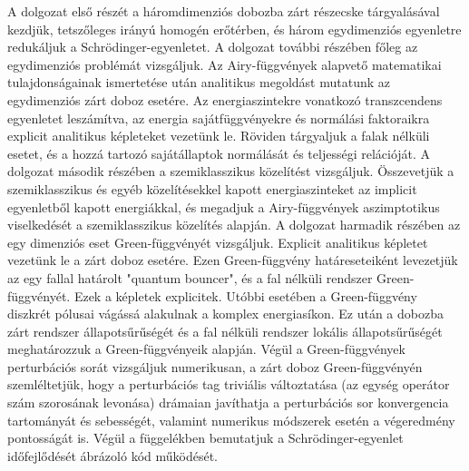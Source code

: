 A dolgozat első részét a háromdimenziós dobozba zárt részecske tárgyalásával kezdjük, tetszőleges irányú homogén erőtérben, és három egydimenziós egyenletre redukáljuk a Schrödinger-egyenletet. A dolgozat további részében főleg az egydimenziós problémát vizsgáljuk. Az Airy-függvények alapvető matematikai tulajdonságainak ismertetése után analitikus megoldást mutatunk az egydimenziós zárt doboz esetére. Az energiaszintekre vonatkozó transzcendens egyenletet leszámítva, az energia sajátfüggvényekre és normálási faktoraikra explicit analitikus képleteket vezetünk le. Röviden tárgyaljuk a falak nélküli esetet, és a hozzá tartozó sajátállaptok normálását és teljességi relációját.
A dolgozat második részében a szemiklasszikus közelítést vizsgáljuk. Összevetjük a szemiklasszikus és egyéb közelítésekkel kapott energiaszinteket az implicit egyenletből kapott energiákkal, és megadjuk a Airy-függvények aszimptotikus viselkedését a szemiklasszikus közelítés alapján.
A dolgozat harmadik részében az egy dimenziós eset Green-függvényét vizsgáljuk. Explicit analitikus képletet vezetünk le a zárt doboz esetére. Ezen Green-függvény határeseteiként levezetjük az egy fallal határolt "quantum bouncer", és a fal nélküli rendszer Green-függvényét. Ezek a képletek explicitek. Utóbbi esetében a Green-függvény diszkrét pólusai vágássá alakulnak a komplex energiasíkon. Ez után a dobozba zárt rendszer állapotsűrűségét és a fal nélküli rendszer lokális állapotsűrűségét meghatározzuk a Green-függvényeik alapján. Végül a Green-függvények perturbációs sorát vizsgáljuk numerikusan, a zárt doboz Green-függvényén szemléltetjük, hogy a perturbációs tag triviális változtatása (az egység operátor szám szorosának levonása) drámaian javíthatja a perturbációs sor konvergencia tartományát és sebességét, valamint numerikus módszerek esetén a végeredmény pontosságát is. Végül a függelékben bemutatjuk a Schrödinger-egyenlet időfejlődését ábrázoló kód működését.